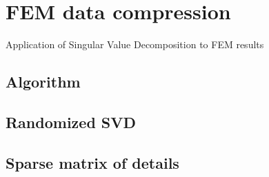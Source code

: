 \section{FEM data compression}
\label{section:method}

Application of Singular Value Decomposition to FEM results

\subsection{Algorithm}

\subsection{Randomized SVD}

\subsection{Sparse matrix of details}
